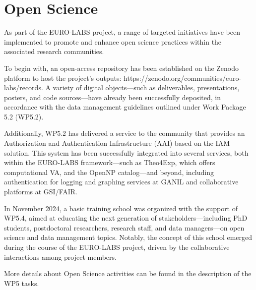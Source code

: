 %
\clearpage
\section{Open Science}
As part of the EURO-LABS project, a range of targeted initiatives have been implemented to promote and enhance open science practices within the associated research communities.

To begin with, an open-access repository has been established on the Zenodo platform to host the project’s outputs: https://zenodo.org/communities/euro-labs/records. A variety of digital objects—such as deliverables, presentations, posters, and code sources—have already been successfully deposited, in accordance with the data management guidelines outlined under Work Package 5.2 (WP5.2).

Additionally, WP5.2 has delivered a service to the community that provides an Authorization and Authentication Infrastructure (AAI) based on the IAM solution. This system has been successfully integrated into several services, both within the EURO-LABS framework—such as Theo4Exp, which offers computational VA, and the OpenNP catalog—and beyond, including authentication for logging and graphing services at GANIL and collaborative platforms at GSI/FAIR.

In November 2024, a basic training school was organized with the support of WP5.4, aimed at educating the next generation of stakeholders—including PhD students, postdoctoral researchers, research staff, and data managers—on open science and data management topics. Notably, the concept of this school emerged during the course of the EURO-LABS project, driven by the collaborative interactions among project members.

More details about Open Science activities can be found in the description of the WP5 tasks. 